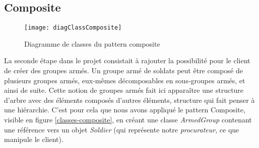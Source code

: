 \subsection{Composite}
\begin{figure}[h]
\begin{center}
    \texttt{[image: diagClassComposite]}
\end{center}
    \caption{Diagramme de classes du pattern composite}
    \label{classes-composite}
\end{figure}

La seconde étape dans le projet consistait à rajouter la possibilité pour le client de créer des groupes armés. Un groupe armé de soldats peut être composé de plusieurs groupes armés, eux-mêmes décomposables en sous-groupes armés, et ainsi de suite. Cette notion de groupes armés fait ici apparaître une structure d'arbre avec des éléments composés d'autres éléments, structure qui fait penser à une hiérarchie. 
C'est pour cela que nous avons appliqué le pattern Composite, visible en figure \vref{classes-composite}, en créant une classe \emph{ArmedGroup} contenant une référence vers un objet \emph{Soldier} (qui représente notre \emph{procurateur}, ce que manipule le client).